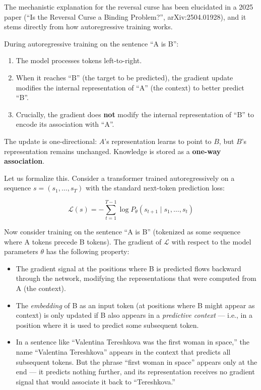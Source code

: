 \documentclass[11pt, a4paper]{article}
\theoremstyle{definition}
\theoremstyle{plain}
\begin{document}
The mechanistic explanation for the reversal curse has been elucidated
in a 2025 paper (``Is the Reversal Curse a Binding Problem?'',
arXiv:2504.01928), and it stems directly from how autoregressive training
works.

\begin{keyinsight}[title={Why the Reversal Curse Occurs}]
During autoregressive training on the sentence ``A is B'':
\begin{enumerate}[leftmargin=2em]
  \item The model processes tokens left-to-right.
  \item When it reaches ``B'' (the target to be predicted), the gradient
    update modifies the internal representation of ``A'' (the context)
    to better predict ``B''.
  \item Crucially, the gradient does \textbf{not} modify the internal
    representation of ``B'' to encode its association with ``A''.
\end{enumerate}
The update is one-directional: $A$'s representation learns to point
to $B$, but $B$'s representation remains unchanged.  Knowledge is
stored as a \textbf{one-way association}.
\end{keyinsight}

Let us formalize this.  Consider a transformer trained autoregressively
on a sequence $s = (s_1, \ldots, s_T)$ with the standard next-token
prediction loss:

\begin{equation}
  \mathcal{L}(s) = -\sum_{t=1}^{T-1} \log P_\theta(s_{t+1} \mid s_1, \ldots, s_t)
  \label{eq:ar_loss}
\end{equation}

Now consider training on the sentence ``A is B'' (tokenized as some
sequence where A tokens precede B tokens).  The gradient of $\mathcal{L}$
with respect to the model parameters $\theta$ has the following property:

\begin{itemize}[leftmargin=2em]
  \item The gradient signal at the positions where B is predicted flows
    backward through the network, modifying the representations that
    were computed from A (the context).
  \item The \emph{embedding} of B as an input token (at positions where
    B might appear as context) is only updated if B also appears in a
    \emph{predictive context} --- i.e., in a position where it is used
    to predict some subsequent token.
  \item In a sentence like ``Valentina Tereshkova was the first woman in
    space,'' the name ``Valentina Tereshkova'' appears in the context
    that predicts all subsequent tokens.  But the phrase ``first woman in
    space'' appears only at the end --- it predicts nothing further, and
    its representation receives no gradient signal that would associate it
    back to ``Tereshkova.''
\end{itemize}
\end{document}
